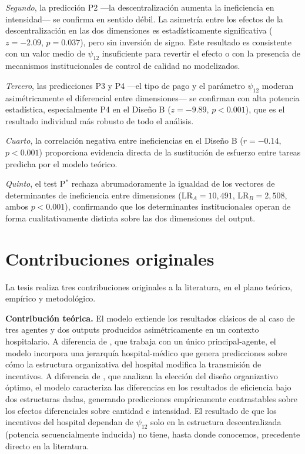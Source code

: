 \documentclass[12pt, a4paper, twoside, openright]{book}
\theoremstyle{plain}
\theoremstyle{definition}
\theoremstyle{remark}
\begin{document}
\textit{Segundo}, la predicción P2 ---la descentralización aumenta la ineficiencia en intensidad--- se confirma en sentido débil. La asimetría entre los efectos de la descentralización en las dos dimensiones es estadísticamente significativa ($z=-2.09$, $p=0.037$), pero sin inversión de signo. Este resultado es consistente con un valor medio de $\psi_{12}$ insuficiente para revertir el efecto o con la presencia de mecanismos institucionales de control de calidad no modelizados.

\textit{Tercero}, las predicciones P3 y P4 ---el tipo de pago y el parámetro $\psi_{12}$ moderan asimétricamente el diferencial entre dimensiones--- se confirman con alta potencia estadística, especialmente P4 en el Diseño B ($z=-9.89$, $p<0.001$), que es el resultado individual más robusto de todo el análisis.

\textit{Cuarto}, la correlación negativa entre ineficiencias en el Diseño B ($r=-0.14$, $p<0.001$) proporciona evidencia directa de la sustitución de esfuerzo entre tareas predicha por el modelo teórico.

\textit{Quinto}, el test P$^*$ rechaza abrumadoramente la igualdad de los vectores de determinantes de ineficiencia entre dimensiones (LR$_A=10{,}491$, LR$_B=2{,}508$, ambos $p<0.001$), confirmando que los determinantes institucionales operan de forma cualitativamente distinta sobre las dos dimensiones del output.

\section{Contribuciones originales}

La tesis realiza tres contribuciones originales a la literatura, en el plano teórico, empírico y metodológico.

\textbf{Contribución teórica.} El modelo extiende los resultados clásicos de \citet{holmstrom1991} al caso de tres agentes y dos outputs producidos asimétricamente en un contexto hospitalario. A diferencia de \citet{holmstrom1991}, que trabaja con un único principal-agente, el modelo incorpora una jerarquía hospital-médico que genera predicciones sobre cómo la estructura organizativa del hospital modifica la transmisión de incentivos. A diferencia de \citet{jelovac2002}, que analizan la elección del diseño organizativo óptimo, el modelo caracteriza las diferencias en los resultados de eficiencia bajo dos estructuras dadas, generando predicciones empíricamente contrastables sobre los efectos diferenciales sobre cantidad e intensidad. El resultado de que los incentivos del hospital dependan de $\psi_{12}$ solo en la estructura descentralizada (potencia secuencialmente inducida) no tiene, hasta donde conocemos, precedente directo en la literatura.
\end{document}
